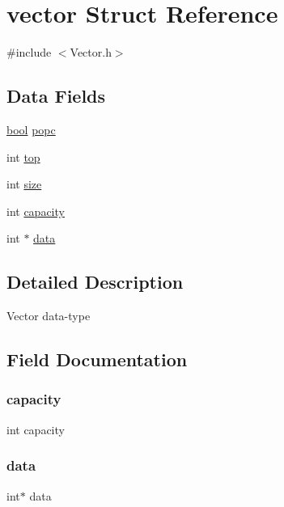 \hypertarget{structvector}{}\section{vector Struct Reference}
\label{structvector}


{\ttfamily \#include $<$Vector.\+h$>$}

\subsection*{Data Fields}
\begin{DoxyCompactItemize}
\item 
\hyperlink{_consts_8h_af6a258d8f3ee5206d682d799316314b1}{bool} \hyperlink{structvector_a2679cd033e6388e644c68ded9ce1fba4}{popc}
\item 
int \hyperlink{structvector_af93f4f37fc2ad9c37af4a715423b110c}{top}
\item 
int \hyperlink{structvector_a439227feff9d7f55384e8780cfc2eb82}{size}
\item 
int \hyperlink{structvector_adbe66a087ac3fd4a5b0566f64ca2d12b}{capacity}
\item 
int $\ast$ \hyperlink{structvector_ac103627c1ad15cbec2f22d0abe6d54b6}{data}
\end{DoxyCompactItemize}


\subsection{Detailed Description}
Vector data-\/type 

\subsection{Field Documentation}
\mbox{\label{structvector_adbe66a087ac3fd4a5b0566f64ca2d12b}} 
\subsubsection{\texorpdfstring{capacity}{capacity}}
{\footnotesize\ttfamily int capacity}

\mbox{\label{structvector_ac103627c1ad15cbec2f22d0abe6d54b6}} 
\subsubsection{\texorpdfstring{data}{data}}
{\footnotesize\ttfamily int$\ast$ data}

